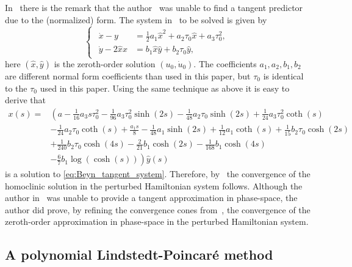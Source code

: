 \begin{remark}
In~\cite{Kuznetsov2014improved} there is the remark that the
author~\cite{Beyn_1994} was unable to find a tangent predictor due to the
(normalized) form. The system in~\cite[Equation (4.5)]{Beyn_1994} to be solved
is given by
\begin{equation}
  \label{eq:Beyn_tangent_system}
  \begin{cases}
  \begin{aligned}
  \dot x  - y &= \frac12 a_1 \hat x^2 + a_2 \tau_0 \hat x + a_3 \tau_0^2, \\
  \dot y -2\hat x x &=  b_1 \hat x \hat y + b_2 \tau_0 \hat y,
  \end{aligned}
  \end{cases}
\end{equation}
here $(\hat x, \hat y)$ is the zeroth-order solution $(u_0, \dot u_0)$. The
coefficients $a_1,a_2,b_1,b_2$ are different normal form coefficients than used
in this paper, but $\tau_0$ is identical to the $\tau_0$ used in this paper.
Using the same technique as above it is easy to derive that
\begin{align*}
x(s) ={}& \left(a -\frac{1}{16} a_3 s  \tau _0^2-\frac{1}{96} a_3 \tau _0^2
	\sinh (2 s ) -\frac{1}{48} a_2 \tau _0 \sinh (2 s )+\frac{1}{24} a_3 \tau _0^2
	\coth (s ) \right . \\ 
					&-\frac{1}{24} a_2 \tau _0 \coth (s )+\frac{a_1 s
	}{8}-\frac{1}{48} a_1 \sinh (2 s ) +\frac{1}{12} a_1 \coth (s )+\frac{1}{15}
	b_2 \tau_0 \cosh (2 s ) \\ 
	&+\frac{1}{240} b_2 \tau _0 \cosh (4 s
	)-\frac{2}{21} b_1 \cosh (2 s )-\frac{1}{168} b_1 \cosh (4 s ) \\ 
	&\left.  -\frac{6}{7} b_1 \log (\cosh (s )) \right) \hat y(s)
\end{align*}
is a solution to \cref{eq:Beyn_tangent_system}. Therefore,
by~\cite{Keller1977} the convergence of the homoclinic solution in
the perturbed Hamiltonian system follows. Although the author
in~\cite{Beyn_1994} was unable to provide a tangent approximation in
phase-space, the author did prove, by refining the convergence cones
from~\cite{JepsonDecker1986}, the convergence of the zeroth-order approximation in
phase-space in the perturbed Hamiltonian system.
\end{remark}


\subsection{A polynomial Lindstedt-Poincar\'e method}
\label{sec:PolynomailLindstedtPoincare}

